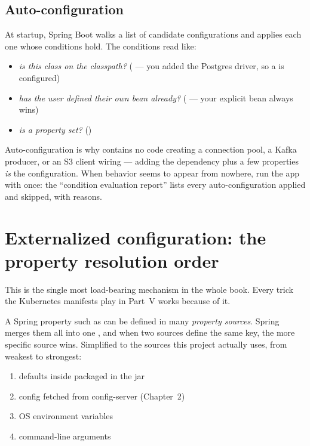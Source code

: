 \subsection{Auto-configuration}

At startup, Spring Boot walks a list of candidate configurations
and applies each one whose conditions hold. The conditions read like:

\begin{itemize}
  \item \emph{is this class on the classpath?} (
  --- you added the Postgres driver, so a  is configured)
  \item \emph{has the user defined their own bean already?}
  ( --- your explicit bean always wins)
  \item \emph{is a property set?} ()
\end{itemize}

Auto-configuration is why  contains no code creating
a connection pool, a Kafka producer, or an S3 client wiring --- adding the
dependency plus a few properties \emph{is} the configuration. When
behavior seems to appear from nowhere, run the app with
 once: the ``condition evaluation report'' lists every
auto-configuration applied and skipped, with reasons.

\section{Externalized configuration: the property resolution order}
\label{sec:property-order}

This is the single most load-bearing mechanism in the whole book.
Every trick the Kubernetes manifests play in Part~V works because of it.

A Spring property such as  can be defined in
many \emph{property sources}. Spring merges them all into one
, and when two sources define the same key, the more
specific source wins. Simplified to the sources this project actually
uses, from weakest to strongest:

\begin{enumerate}
  \item defaults inside  packaged in the jar
  \item config fetched from config-server (Chapter~2)
  \item OS environment variables
  \item command-line arguments
\end{enumerate}

